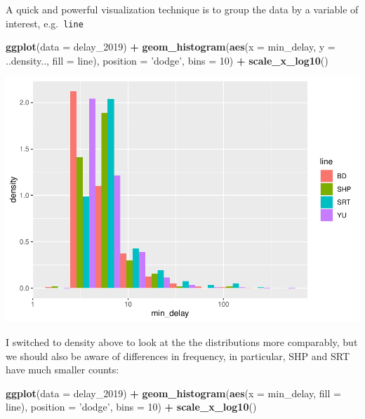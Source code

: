 \documentclass[
]{book}
\newenvironment{Shaded}{\begin{snugshade}}{\end{snugshade}}
\newcommand{\DataTypeTok}[1]{\textcolor[rgb]{0.13,0.29,0.53}{#1}}
\newcommand{\DecValTok}[1]{\textcolor[rgb]{0.00,0.00,0.81}{#1}}
\newcommand{\KeywordTok}[1]{\textcolor[rgb]{0.13,0.29,0.53}{\textbf{#1}}}
\newcommand{\NormalTok}[1]{#1}
\newcommand{\OperatorTok}[1]{\textcolor[rgb]{0.81,0.36,0.00}{\textbf{#1}}}
\newcommand{\StringTok}[1]{\textcolor[rgb]{0.31,0.60,0.02}{#1}}
\begin{document}
A quick and powerful visualization technique is to group the data by a variable of interest, e.g.~\texttt{line}

\begin{Shaded}
\begin{Highlighting}[]
\KeywordTok{ggplot}\NormalTok{(}\DataTypeTok{data =}\NormalTok{ delay_}\DecValTok{2019}\NormalTok{) }\OperatorTok{+}\StringTok{ }
\StringTok{  }\KeywordTok{geom_histogram}\NormalTok{(}\KeywordTok{aes}\NormalTok{(}\DataTypeTok{x =}\NormalTok{ min_delay, }\DataTypeTok{y =}\NormalTok{ ..density.., }\DataTypeTok{fill =}\NormalTok{ line), }\DataTypeTok{position =} \StringTok{'dodge'}\NormalTok{, }\DataTypeTok{bins =} \DecValTok{10}\NormalTok{) }\OperatorTok{+}\StringTok{ }\KeywordTok{scale_x_log10}\NormalTok{()}
\end{Highlighting}
\end{Shaded}

\includegraphics{telling_stories_with_data_files/figure-latex/unnamed-chunk-260-1.pdf}

I switched to density above to look at the the distributions more comparably, but we should also be aware of differences in frequency, in particular, SHP and SRT have much smaller counts:

\begin{Shaded}
\begin{Highlighting}[]
\KeywordTok{ggplot}\NormalTok{(}\DataTypeTok{data =}\NormalTok{ delay_}\DecValTok{2019}\NormalTok{) }\OperatorTok{+}\StringTok{ }
\StringTok{  }\KeywordTok{geom_histogram}\NormalTok{(}\KeywordTok{aes}\NormalTok{(}\DataTypeTok{x =}\NormalTok{ min_delay, }\DataTypeTok{fill =}\NormalTok{ line), }\DataTypeTok{position =} \StringTok{'dodge'}\NormalTok{, }\DataTypeTok{bins =} \DecValTok{10}\NormalTok{) }\OperatorTok{+}\StringTok{ }\KeywordTok{scale_x_log10}\NormalTok{()}
\end{Highlighting}
\end{Shaded}
\end{document}
